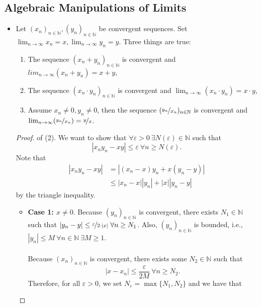\documentclass{article}
\newcommand{\N}{\mathbb{N}}
\newcommand{\seq}[2]{(#1_{#2})_{#2 \in \N}}
\newcommand{\?}{\stackrel{?}{=}}
\newcommand{\smallblacksquare}{\rule{0.5em}{0.5em}}
\theoremstyle{definition} %
\begin{document}
\subsection{Algebraic Manipulations of Limits}

\begin{itemize}
    \item[]
    \begin{lemma}
        Let $\seq{x}{n}, \seq{y}{n}$ be convergent sequences. Set $\lim_{n \to \infty} x_n = x, \lim_{n \to \infty} y_n = y$. Three things are true:
    \begin{enumerate}[label=(\arabic*)]
        \item The sequence $(x_n + y_n)_{n \in \N}$ is convergent and $lim_{n \to \infty} (x_n + y_n) = x + y$,
        \item The sequence $(x_n \cdot y_n)_{n \in \N}$ is convergent and $\lim_{n \to \infty} (x_n \cdot y_n) = x \cdot y$,
        \item Assume $x_n \neq 0, y_n \neq 0$, then the sequence $(\nicefrac{y_n}{x_n})_{n \in \N}$ is convergent and $\lim_{n \to \infty} (\nicefrac{y_n}{x_n}) = \nicefrac{y}{x}$.
    \end{enumerate}
    \end{lemma}
    \begin{proof}
        of (2). We want to show that $\forall \varepsilon > 0 \ \exists N(\varepsilon) \in \N$ such that
        $$|x_ny_n - xy| \leq \varepsilon \ \forall n \geq N(\varepsilon).$$
        Note that
        \begin{align*}
            |x_ny_n - xy| &= |(x_n - x)y_n + x(y_n - y)| \\
            &\leq |x_n - x||y_n| + |x||y_n - y|
        \end{align*}
        by the triangle inequality.
        \begin{itemize}[label=\smallblacksquare]
            \item \textbf{Case 1: $x \neq 0$}. Because $\seq{y}{n}$ is convergent, there exists $N_1 \in \N$ such that $|y_n - y| \leq \nicefrac{\varepsilon}{2 \cdot |x|} \ \forall n \geq N_1$. Also, $\seq{y}{n}$ is bounded, i.e., $|y_n| \leq M \ \forall n \in \N \ \exists M \geq 1$. \\\\
            Because $\seq{x}{n}$ is convergent, there exists some $N_2 \in \N$ such that
            $$|x - x_n| \leq \frac{\varepsilon}{2M} \ \forall n \geq N_2.$$
            Therefore, for all $\varepsilon > 0$, we set $N_\varepsilon = \max\{N_1, N_2\}$ and we have that

\end{itemize}
\end{proof}
\end{itemize}
\end{document}
